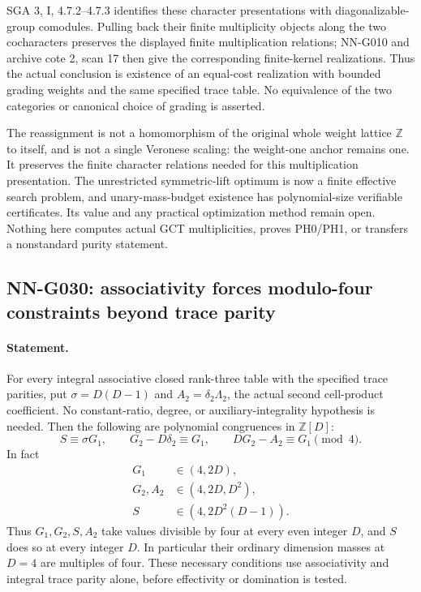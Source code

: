 SGA 3, I, 4.7.2--4.7.3 identifies these character
presentations with diagonalizable-group comodules.
Pulling back their finite multiplicity objects along
the two cocharacters preserves the displayed finite
multiplication relations; NN-G010 and archive cote 2,
scan 17 then give the corresponding finite-kernel
realizations. Thus the actual conclusion is existence
of an equal-cost realization with bounded grading
weights and the same specified trace table. No equivalence
of the two categories or canonical choice of grading
is asserted.

The reassignment is not a homomorphism of the original
whole weight lattice $\mathbb Z$ to itself, and is not
a single Veronese scaling: the weight-one anchor remains
one. It preserves the finite character relations needed
for this multiplication presentation. The unrestricted
symmetric-lift optimum is now a finite effective search
problem, and unary-mass-budget existence has polynomial-size
verifiable certificates. Its value and any practical
optimization method remain open. Nothing here computes actual GCT multiplicities,
proves PH0/PH1, or transfers a nonstandard purity statement.

\subsection{NN-G030: associativity forces modulo-four constraints beyond trace parity}
\paragraph{Statement.}
For every integral associative closed rank-three table with
the specified trace parities, put $\sigma=D(D-1)$ and
$A_2=\delta_2\Lambda_2$, the actual second cell-product
coefficient. No constant-ratio, degree, or auxiliary-integrality
hypothesis is needed. Then the following are polynomial
congruences in $\mathbb Z[D]$:
\[
 S\equiv\sigma G_1,\qquad
 G_2-D\delta_2\equiv G_1,\qquad
 DG_2-A_2\equiv G_1\pmod4.                           \tag{G030.1}
\]
In fact
\[
 \begin{aligned}
 G_1&\in(4,2D),\\
 G_2,A_2&\in(4,2D,D^2),\\
 S&\in(4,2D^2(D-1)).
 \end{aligned}                                                       \tag{G030.2}
\]
Thus $G_1,G_2,S,A_2$ take values divisible by four
at every even integer $D$, and $S$ does so at every
integer $D$. In particular their ordinary dimension
masses at $D=4$ are multiples of four.
These necessary conditions use associativity and
integral trace parity alone, before effectivity or
domination is tested.

